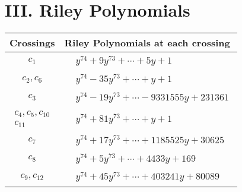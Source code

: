 \documentclass[1p]{elsarticle_modified}
\theoremstyle{definition}
\begin{document}
\centering \section*{ III. Riley Polynomials}
\begin{tabular}{m{50pt}|m{274pt}}
Crossings & \hspace{64pt}Riley Polynomials at each crossing \\
\hline $$\begin{aligned}c_{1}\end{aligned}$$&$\begin{aligned}
&y^{74}+9 y^{73}+\cdots+5 y+1
\end{aligned}$\\
\hline $$\begin{aligned}c_{2},c_{6}\end{aligned}$$&$\begin{aligned}
&y^{74}-35 y^{73}+\cdots+y+1
\end{aligned}$\\
\hline $$\begin{aligned}c_{3}\end{aligned}$$&$\begin{aligned}
&y^{74}-19 y^{73}+\cdots-9331555 y+231361
\end{aligned}$\\
\hline $$\begin{aligned}c_{4},c_{5},c_{10}\\c_{11}\end{aligned}$$&$\begin{aligned}
&y^{74}+81 y^{73}+\cdots+y+1
\end{aligned}$\\
\hline $$\begin{aligned}c_{7}\end{aligned}$$&$\begin{aligned}
&y^{74}+17 y^{73}+\cdots+1185525 y+30625
\end{aligned}$\\
\hline $$\begin{aligned}c_{8}\end{aligned}$$&$\begin{aligned}
&y^{74}+5 y^{73}+\cdots+4433 y+169
\end{aligned}$\\
\hline $$\begin{aligned}c_{9},c_{12}\end{aligned}$$&$\begin{aligned}
&y^{74}+45 y^{73}+\cdots+403241 y+80089
\end{aligned}$\\
\hline
\end{tabular}
\vskip 2pc
\end{document}
